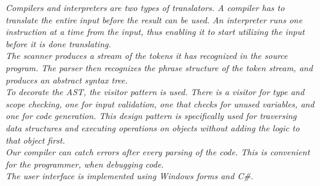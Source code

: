 \vspace{30pt}

\textit{Compilers and interpreters are two types of translators. A compiler has to translate the entire input before the result can be used. An interpreter runs one instruction at a time from the input, thus enabling it to start utilizing the input before it is done translating.\\ \indent
  The scanner produces a stream of the tokens it has recognized in the source program. The parser then recognizes the phrase structure of the token stream, and produces an abstract syntax tree.\\ \indent
  To decorate the AST, the visitor pattern is used. There is a visitor for type and scope checking, one for input validation, one that checks for unused variables, and one for code generation.
This design pattern is specifically used for traversing data structures and executing operations on objects without adding the logic to that object first.\\ \indent
  Our compiler can catch errors after every parsing of the code. This is convenient for the programmer, when debugging code.\\ \indent
  The user interface is implemented using Windows forms and C\#. }
	
